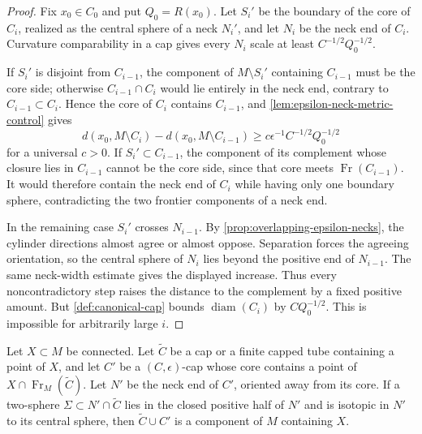 \begin{proof}
Fix $x_0\in C_0$ and put $Q_0=R(x_0)$.  Let $S_i'$ be the boundary of
the core of $C_i$, realized as the central sphere of a neck $N_i'$, and
let $N_i$ be the neck end of $C_i$.  Curvature comparability in a cap
gives every $N_i$ scale at least
$C^{-1/2}Q_0^{-1/2}$.

If $S_i'$ is disjoint from $C_{i-1}$, the component of
$M\setminus S_i'$ containing $C_{i-1}$ must be the core side; otherwise
$C_{i-1}\cap C_i$ would lie entirely in the neck end, contrary to
$C_{i-1}\subset C_i$.  Hence the core of $C_i$ contains $C_{i-1}$, and
\ref{lem:epsilon-neck-metric-control} gives
\[
 d(x_0,M\setminus C_i)-d(x_0,M\setminus C_{i-1})
 \ge c\epsilon^{-1}C^{-1/2}Q_0^{-1/2}
\]
for a universal $c>0$.  If $S_i'\subset C_{i-1}$, the component of its
complement whose closure lies in $C_{i-1}$ cannot be the core side, since
that core meets $\operatorname{Fr}(C_{i-1})$.  It would therefore contain
the neck end of $C_i$ while having only one boundary sphere, contradicting
the two frontier components of a neck end.

In the remaining case $S_i'$ crosses $N_{i-1}$.
By \ref{prop:overlapping-epsilon-necks}, the cylinder directions almost
agree or almost oppose.  Separation forces the agreeing orientation, so
the central sphere of $N_i$ lies beyond the positive end of $N_{i-1}$.
The same neck-width estimate gives the displayed increase.  Thus every
noncontradictory step raises the distance to the complement by a fixed
positive amount.  But \ref{def:canonical-cap} bounds
$\operatorname{diam}(C_i)$ by $CQ_0^{-1/2}$.  This is impossible for
arbitrarily large $i$.
\end{proof}

\begin{lemma}
\label{lem:isotopic-cap-gluing-sphere}
\notready
Let $X\subset M$ be connected.  Let $\widetilde C$ be a cap or a finite
capped tube containing a point of $X$, and let $C'$ be a
$(C,\epsilon)$-cap whose core contains a point of
$X\cap\operatorname{Fr}_M(\widetilde C)$.  Let $N'$ be the neck end of
$C'$, oriented away from its core.  If a two-sphere
$\Sigma\subset N'\cap\widetilde C$ lies in the closed positive half of
$N'$ and is isotopic in $N'$ to its central sphere, then
$\widetilde C\cup C'$ is a component of $M$ containing $X$.
\end{lemma}

